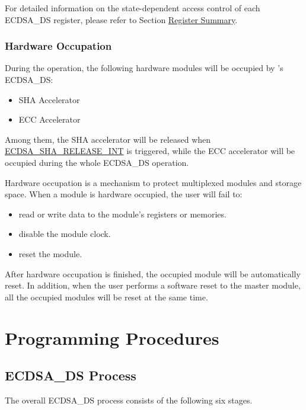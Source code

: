 \documentclass[main\_\_EN.tex]{subfiles}
\begin{document}
For detailed information on the state-dependent access control of each ECDSA\_DS register, please refer to Section \hyperref[sec:ecdsa-reg-summ]{Register Summary}.

\subsubsection{Hardware Occupation}

During the operation, the following hardware modules will be occupied by \chipname{}'s ECDSA\_DS:
\begin{itemize}
    \item SHA Accelerator
    \item ECC Accelerator
\end{itemize}
Among them, the SHA accelerator will be released when \hyperref[int:ECDSASHARELEASEINT]{ECDSA\_SHA\_RELEASE\_INT} is triggered, while the ECC accelerator will be occupied during the whole ECDSA\_DS operation.

\begin{tiplisting}
Hardware occupation is a mechanism to protect multiplexed modules and storage space. When a module is hardware occupied, the user will fail to:
\vspace{-0.5em}
\begin{itemize}
    \item read or write data to the module's registers or memories.
    \item disable the module clock.
    \item reset the module.
\end{itemize}
\vspace{-0.5em}
After hardware occupation is finished, the occupied module will be automatically reset. In addition, when the user performs a software reset to the master module, all the occupied modules will be reset at the same time.
\end{tiplisting}



\section{Programming Procedures}
\label{sec:ecdsa-prog-procedures}

\subsection{ECDSA\_DS Process}
The overall ECDSA\_DS process consists of the following six stages.
\end{document}
